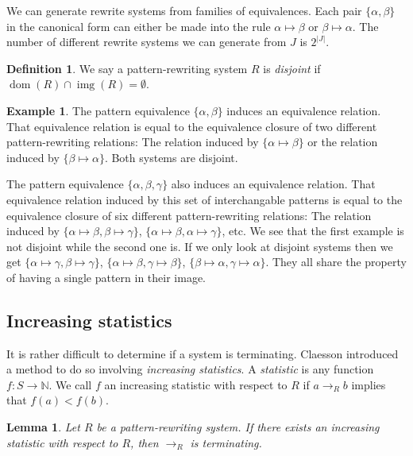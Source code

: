 \documentclass[a4paper, 11pt, english]{article}
\newcommand{\patternrule}{ \mapsto \!}
\newtheorem{lemma}[theorem]{Lemma}
\theoremstyle{definition}
\newtheorem{definition}[theorem]{Definition}
\newtheorem{example}[theorem]{Example}
\newcommand{\Sym}{S}
\DeclareMathOperator{\dom}{dom}
\DeclareMathOperator{\img}{img}
\begin{document}
We can generate rewrite systems from families of equivalences. Each pair $\{\alpha, \beta \}$ in the
canonical form can either be made into the rule $\alpha \patternrule \beta$ or $\beta \patternrule
\alpha$. The number of different rewrite systems we can generate from $J$ is $2^{|J|}$.

\begin{definition}
  We say a pattern-rewriting system $R$ is \emph{disjoint} if $\dom(R) \cap \img(R) = \emptyset$.
\end{definition}

\begin{example}
  The pattern equivalence $\{ \alpha, \beta \}$ induces an equivalence relation.
  That equivalence relation is equal to the equivalence closure of two different pattern-rewriting
  relations: The relation induced by $\{ \alpha \patternrule \beta \}$ or the relation induced by
  $\{ \beta \patternrule \alpha \}$. Both systems are disjoint.

  The pattern equivalence $\{ \alpha, \beta, \gamma \}$ also induces an equivalence relation.
  That equivalence relation induced by this set of interchangable patterns is equal to the
  equivalence closure of six different pattern-rewriting
  relations: The relation induced by $\{ \alpha \patternrule \beta, \beta \patternrule \gamma \}$,
  $\{ \alpha \patternrule \beta, \alpha \patternrule \gamma \}$, etc. We see that the first example is
  not disjoint while the second one is. If we only look at disjoint systems then we get
  $\{ \alpha \patternrule \gamma, \beta \patternrule \gamma \}$,
  $\{ \alpha \patternrule \beta, \gamma \patternrule \beta \}$,
  $\{ \beta \patternrule \alpha, \gamma \patternrule \alpha \}$.
  They all share the property of having a single pattern in their image.
\end{example}

\subsection{Increasing statistics}
It is rather difficult to determine if a system is terminating. Claesson introduced a method to
do so involving \emph{increasing statistics}.
A \emph{statistic} is any function $f : \Sym \to \mathbb{N}$. We call $f$ an increasing
statistic with respect to $R$ if $a \to_R b$ implies that $f(a) < f(b)$.

\begin{lemma}
    Let $R$ be a pattern-rewriting system. If there exists an increasing
    statistic with respect to $R$, then $\to_R$ is terminating.    
\end{lemma}
\end{document}
